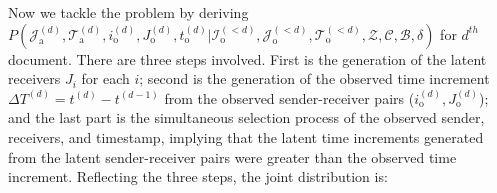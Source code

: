 \documentclass[a4paper]{article}
\begin{document}
  	       Now we tackle the problem by deriving $P(\mathcal{J}^{(d)}_{\mbox{a}}, \mathcal{T}^{(d)}_{\mbox{a}}, i^{(d)}_{\mbox{o}}, J^{(d)}_{\mbox{o}}, t^{(d)}_{\mbox{o}} |\mathcal{I}^{(<d)}_{\mbox{o}}, \mathcal{J}^{(<d)}_{\mbox{o}}, \mathcal{T}^{(<d)}_{\mbox{o}}, \mathcal{Z}, \mathcal{C}, \mathcal{B}, \delta)$ for $d^{th}$ document. There are three steps involved. First is the generation of the latent receivers $J_i$ for each $i$; second is the generation of the observed time increment $\Delta T^{(d)} = t^{(d)} - t^{(d-1)}$ from the observed sender-receiver pairs ($i^{(d)}_{\mbox{o}}, J^{(d)}_{\mbox{o}}$); and the last part is the simultaneous selection process of the observed sender, receivers, and timestamp, implying that the latent time increments generated from the latent sender-receiver pairs were greater than the observed time increment. Reflecting the three steps, the joint distribution is:\\
\end{document}
